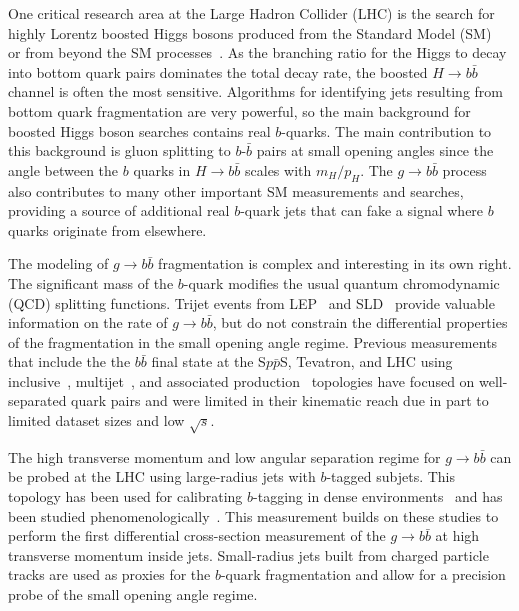 One critical research area at the Large Hadron Collider (LHC) is the search for highly Lorentz boosted Higgs bosons produced from the Standard Model (SM)~\cite{Sirunyan:2017dgc} or from beyond the SM processes~\cite{Aaboud:2017ecz,Aaboud:2017ahz,Aaboud:2017yqz,Aaboud:2016xco,Khachatryan:2016cfa,Sirunyan:2017nrt}.  As the branching ratio for the Higgs to decay into bottom quark pairs dominates the total decay rate, the boosted $H\rightarrow b\bar{b}$ channel is often the most sensitive.  Algorithms for identifying jets resulting from bottom quark fragmentation are very powerful, so the main background for boosted Higgs boson searches contains real $b$-quarks.  The main contribution to this background is gluon splitting to $b$-$\bar{b}$ pairs at small opening angles since the angle between the $b$ quarks in $H\rightarrow b\bar{b}$ scales with $m_H/p_H$.  The $g\rightarrow b\bar{b}$ process also contributes to many other important SM measurements and searches, providing a source of additional real $b$-quark jets that can fake a signal where $b$ quarks originate from elsewhere.  


The modeling of $g\rightarrow b\bar{b}$ fragmentation is complex and interesting in its own right.  The significant mass of the $b$-quark modifies the usual quantum chromodynamic (QCD) splitting functions.  Trijet events from LEP~\cite{Barate:1998vs,Abbiendi:2000zt,Abreu:1999qh} and SLD~\cite{Abe:2001csa} provide valuable information on the rate of $g\rightarrow b\bar{b}$, but do not constrain the differential properties of the fragmentation in the small opening angle regime.  Previous measurements that include the the $b\bar{b}$ final state at the S$p\bar{p}$S, Tevatron, and LHC using inclusive~\cite{Albajar:1993be,Albajar:1990zu,Aaboud:2017vqt,Khachatryan:2011wq,Chatrchyan:2012hw,Aad:2011rr,Abbott:1999se,Aaltonen:2007zza,Abbott:1999wu,Abachi:1994kj,Khachatryan:2011wq,Aaij:2017pvu,Aaij:2010gn,Aaij:2013noa,Aaij:2012jd,Aaij:2010gn,Aad:2012jga,Aad:2011sp,Aad:2015duc,Khachatryan:2010yr,Acosta:2004yw,ATLAS:2013cia}, multijet~\cite{Aaboud:2016jed,ATLAS:2011ac,Chatrchyan:2012dk}, and associated production~\cite{Aad:2013vka,Aad:2014dvb,Chatrchyan:2014dha,Abazov:2014fka,Abazov:2013uza,Abazov:2015aha,Aaltonen:2013ama,Aaltonen:2009qi,Aaltonen:2008mt,Chatrchyan:2013zja,Chatrchyan:2013zja} topologies have focused on well-separated quark pairs and were limited in their kinematic reach due in part to limited dataset sizes and low $\sqrt{s}$.

The high transverse momentum and low angular separation regime for $g\rightarrow b\bar{b}$ can be probed at the LHC using large-radius jets with $b$-tagged subjets. This topology has been used for calibrating $b$-tagging in dense environments~\cite{ATLAS-CONF-2016-039,ATLAS-CONF-2016-002,CMS:2013vea} and has been studied phenomenologically~\cite{Anderle:2017qwx,Ilten:2017rbd}.  This measurement builds on these studies to perform the first differential cross-section measurement of the $g\rightarrow b\bar{b}$ at high transverse momentum inside jets.  Small-radius jets built from charged particle tracks are used as proxies for the $b$-quark fragmentation and allow for a precision probe of the small opening angle regime.

